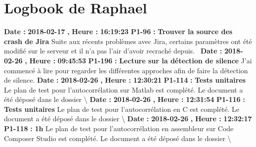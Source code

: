 \documentclass{article}%
\begin{document}
%
\section{Logbook de Raphael}%
\textbf{Date : }%
\textbf{2018{-}02{-}17}%
\textbf{,}%
\textbf{ Heure : }%
\textbf{16:19:23}%
\newline%
%
\textbf{P1{-}96 }%
\textbf{ : }%
\textbf{ Trouver la source des crash de Jira}%
\newline%
\newline%
%
Suite aux récents problèmes avec Jira, certains paramètres ont été modifié sur le serveur et il n'a pas l'air d'avoir recraché depuis.~\newline%
\newline%
%
\textbf{Date : }%
\textbf{2018{-}02{-}26}%
\textbf{,}%
\textbf{ Heure : }%
\textbf{09:45:53}%
\newline%
%
\textbf{P1{-}196 }%
\textbf{ : }%
\textbf{ Lecture sur la détection de silence}%
\newline%
\newline%
%
J'ai commencé à lire pour regarder les différentes approches afin de faire la détection de silence.\newline%
\newline%
%
\textbf{Date : }%
\textbf{2018{-}02{-}26}%
\textbf{,}%
\textbf{ Heure : }%
\textbf{12:30:21}%
\newline%
%
\textbf{P1{-}114 }%
\textbf{ : }%
\textbf{ Tests unitaires}%
\newline%
\newline%
%
Le plan de test pour l'autocorrélation sur Matlab est complété. Le document a été déposé dans le dossier \textbackslash{}\newline%
\newline%
%
\textbf{Date : }%
\textbf{2018{-}02{-}26}%
\textbf{,}%
\textbf{ Heure : }%
\textbf{12:31:54}%
\newline%
%
\textbf{P1{-}116 }%
\textbf{ : }%
\textbf{ Tests unitaires}%
\newline%
\newline%
%
Le plan de test pour l'autocorrélation en C est complété. Le document a été déposé dans le dossier \textbackslash{}\newline%
\newline%
%
\textbf{Date : }%
\textbf{2018{-}02{-}26}%
\textbf{,}%
\textbf{ Heure : }%
\textbf{12:32:17}%
\newline%
%
\textbf{P1{-}118 }%
\textbf{ : }%
\textbf{ 1h}%
\newline%
\newline%
%
Le plan de test pour l'autocorrélation en assembleur sur Code Composer Studio est complété. Le document a été déposé dans le dossier \textbackslash{}\newline%
\newline%
%
\newpage
\end{document}
